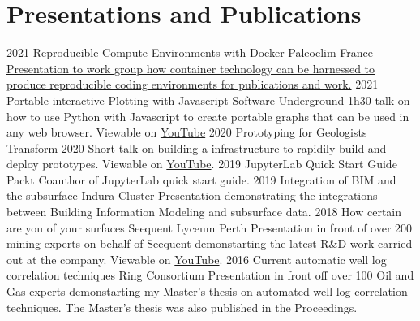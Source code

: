 \documentclass[]{friggeri-cv}
\begin{document}
\begin{entrylist}

\end{entrylist}
\newpage
\vspace*{\fill}
\section{Presentations and Publications}
\begin{entrylist}
	\entry
	{2021}
	{Reproducible Compute Environments with Docker}
	{Paleoclim France}
	{\href{https://wesleythegeolien.github.io/Presentations/docker_reproducible_envs/index.html}{Presentation to work group how container technology can be harnessed to produce reproducible coding environments for publications and work.}}
	\entry
	{2021}
	{Portable interactive Plotting with Javascript}
	{Software Underground}
	{1h30 talk on how to use Python with Javascript to create portable graphs that can be used in any web browser. Viewable on \href{https://www.youtube.com/watch?v=j\_4wkMzGvKs}{YouTube}}
	\entry
	{2020}
	{Prototyping for Geologists}
	{Transform 2020}
	{Short talk on building a infrastructure to rapidily build and deploy prototypes.
	Viewable on \href{https://youtu.be/rUbvueIF5f8?t=4130}{YouTube}.}
	\entry
	{2019}
	{JupyterLab Quick Start Guide}
	{Packt}
	{Coauthor of JupyterLab quick start guide.}
	\entry
	{2019}
	{Integration of BIM and the subsurface}
	{Indura Cluster}
	{Presentation demonstrating the integrations between Building Information Modeling and subsurface data.}
	\entry
	{2018}
	{How certain are you of your surfaces}
	{Seequent Lyceum Perth}
	{Presentation in front of over 200 mining experts on behalf of Seequent demonstarting the latest R\&D work carried out at the company. Viewable on \href{https://www.youtube.com/watch?v=jt26J5ljlA0}{YouTube}.}
	\entry
	{2016}
	{Current automatic well log correlation techniques}
	{Ring Consortium}
	{Presentation in front off over 100 Oil and Gas experts demonstarting my Master's thesis on automated well log correlation techniques. The Master's thesis was also published in the Proceedings.}
\end{entrylist}
\end{document}
